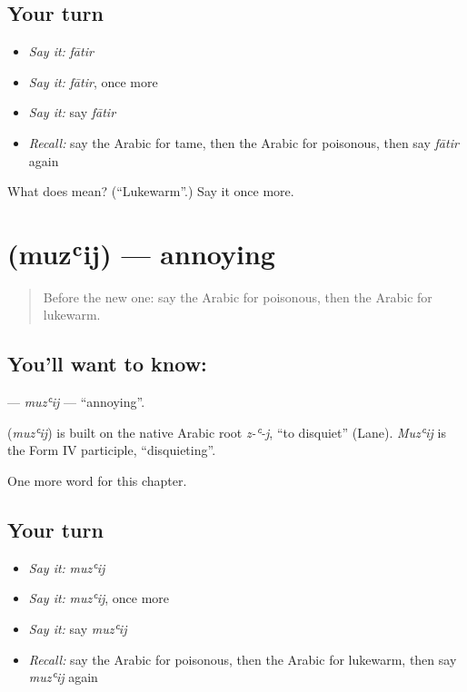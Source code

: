 \subsection*{Your turn}
\begin{itemize}
\raggedright
  \item \emph{Say it:} \emph{fātir}
  \item \emph{Say it:} \emph{fātir}, once more
  \item \emph{Say it:} say \emph{fātir}
  \item \emph{Recall:} say the Arabic for tame, then the Arabic for poisonous, then say \emph{fātir} again
\end{itemize}

\begin{tcolorbox}[breakable,colback=teal!4,colframe=teal!35!black,title={Before you move on}]
What does  mean? (\textquotedblleft{}Lukewarm\textquotedblright{}.) Say it once more.
\end{tcolorbox}
\section[\texorpdfstring{\ar{مزعج} (muzʿij)}{مزعج (muzʿij)}]{ (muzʿij) — annoying}

\label{lesson:AR-C243-muzij}



\begin{quote}
Before the new one: say the Arabic for poisonous, then the Arabic for lukewarm.
\end{quote}

\subsection*{You'll want to know: }
\textbf{} — \emph{muzʿij} — \textquotedblleft{}annoying\textquotedblright{}.

\begin{cousinweb}
\textbf{} (\emph{muzʿij}) is built on the native Arabic root \emph{z-ʿ-j}, \textquotedblleft{}to disquiet\textquotedblright{} (Lane). \emph{Muzʿij} is the Form IV participle, \textquotedblleft{}disquieting\textquotedblright{}.
\end{cousinweb}

\begin{grammarlens}[title={What you've built}]
One more word for this chapter.
\end{grammarlens}

\subsection*{Your turn}
\begin{itemize}
\raggedright
  \item \emph{Say it:} \emph{muzʿij}
  \item \emph{Say it:} \emph{muzʿij}, once more
  \item \emph{Say it:} say \emph{muzʿij}
  \item \emph{Recall:} say the Arabic for poisonous, then the Arabic for lukewarm, then say \emph{muzʿij} again
\end{itemize}

